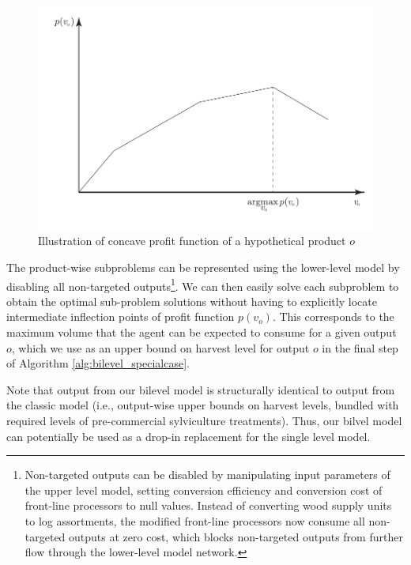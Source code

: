 \begin{figure}[h]
  \centering
  \includegraphics[width=\textwidth]{images/pvo}
  \caption{Illustration of concave profit function of a hypothetical product $o$}
  \label{fig:pvo}
\end{figure}

The product-wise subproblems can be represented using the lower-level model by disabling all non-targeted outputs\footnote{Non-targeted outputs can be disabled by manipulating input parameters of the upper level model, setting conversion efficiency and conversion cost of front-line processors to null values. Instead of converting wood supply units to log assortments, the modified front-line processors now consume all non-targeted outputs at zero cost, which blocks non-targeted outputs from further flow through the lower-level model network.}. 
We can then easily solve each subproblem to obtain the optimal sub-problem solutions without having to explicitly locate intermediate inflection points of profit function $p(v_o)$. 
This corresponds to the maximum volume that the agent can be expected to consume for a given output $o$, which we use as an upper bound on harvest level for output $o$ in the final step of Algorithm \ref{alg:bilevel_specialcase}.

Note that output from our bilevel model is structurally identical to output from the classic model (i.e., output-wise upper bounds on harvest levels, bundled with required levels of pre-commercial sylviculture treatments). 
Thus, our bilvel model can potentially be used as a drop-in replacement for the single level model.

